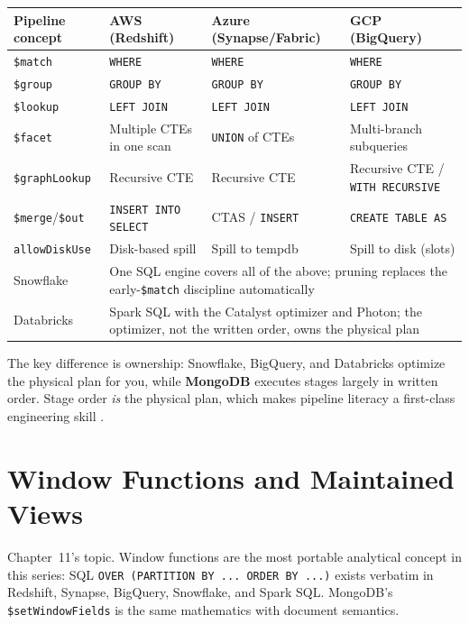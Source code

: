 \begin{center}
\footnotesize
\begin{tabular}{@{}p{2.9cm}p{3.0cm}p{3.0cm}p{3.0cm}@{}}
\toprule
\textbf{Pipeline concept} & \textbf{AWS (Redshift)} & \textbf{Azure (Synapse/Fabric)} & \textbf{GCP (BigQuery)} \\
\midrule
\texttt{\$match} & \texttt{WHERE} & \texttt{WHERE} & \texttt{WHERE} \\
\texttt{\$group} & \texttt{GROUP BY} & \texttt{GROUP BY} & \texttt{GROUP BY} \\
\texttt{\$lookup} & \texttt{LEFT JOIN} & \texttt{LEFT JOIN} & \texttt{LEFT JOIN} \\
\texttt{\$facet} & Multiple CTEs in one scan & \texttt{UNION} of CTEs & Multi-branch subqueries \\
\texttt{\$graphLookup} & Recursive CTE & Recursive CTE & Recursive CTE / \texttt{WITH RECURSIVE} \\
\texttt{\$merge}/\texttt{\$out} & \texttt{INSERT INTO SELECT} & CTAS / \texttt{INSERT} & \texttt{CREATE TABLE AS} \\
\texttt{allowDiskUse} & Disk-based spill & Spill to tempdb & Spill to disk (slots) \\
\addlinespace
Snowflake & \multicolumn{3}{l}{One SQL engine covers all of the above; pruning replaces the early-\texttt{\$match} discipline automatically} \\
Databricks & \multicolumn{3}{l}{Spark SQL with the Catalyst optimizer and Photon; the optimizer, not the written order, owns the physical plan} \\
\bottomrule
\end{tabular}
\end{center}

\noindent The key difference is ownership: Snowflake, BigQuery, and Databricks optimize the
physical plan for you, while \textbf{MongoDB} executes stages largely in written order. Stage
order \emph{is} the physical plan, which makes pipeline literacy a first-class engineering skill
\cite{mongodbAggregationDocs}.

\section{Window Functions and Maintained Views}
%
Chapter~11's topic. Window functions are the most portable analytical concept in this series:
SQL \texttt{OVER (PARTITION BY ... ORDER BY ...)} exists verbatim in Redshift, Synapse, BigQuery,
Snowflake, and Spark SQL. MongoDB's \texttt{\$setWindowFields} is the same mathematics with
document semantics.

